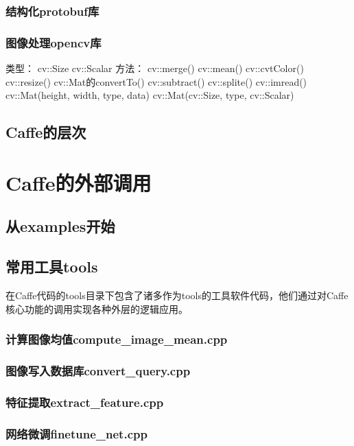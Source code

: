 \documentclass{../NanCNBook}
\begin{document}
\section{结构化protobuf库}

\section{图像处理opencv库}
类型：
cv::Size
cv::Scalar
方法：
cv::merge()
cv::mean()
cv::cvtColor()
cv::resize()
cv::Mat的convertTo()
cv::subtract()
cv::splite()
cv::imread()
cv::Mat(height, width, type, data)
cv::Mat(cv::Size, type, cv::Scalar)
\chapter{Caffe的层次}

\part{Caffe的外部调用}

\chapter{从examples开始}


\chapter{常用工具tools}
在Caffe代码的tools目录下包含了诸多作为tools的工具软件代码，他们通过对Caffe核心功能的调用实现各种外层的逻辑应用。

\section{计算图像均值compute\_image\_mean.cpp}

\section{图像写入数据库convert\_query.cpp}


                    



\section{特征提取extract\_feature.cpp}

\section{网络微调finetune\_net.cpp}
\end{document}
